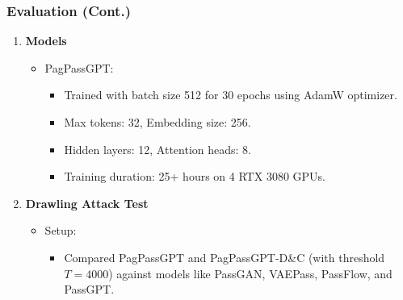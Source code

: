 \documentclass[
	12pt, %
]{beamer}
\begin{document}
\begin{frame}
	\frametitle{Evaluation (Cont.)}
	
	\begin{enumerate}
		\item \textbf{Models}
		\begin{itemize}
			\item PagPassGPT:
			\begin{itemize}
				\item Trained with batch size 512 for 30 epochs using AdamW optimizer.
				\item Max tokens: 32, Embedding size: 256.
				\item Hidden layers: 12, Attention heads: 8.
				\item Training duration: 25+ hours on 4 RTX 3080 GPUs.
			\end{itemize}
		\end{itemize}
		
		\item \textbf{Drawling Attack Test}
		\begin{itemize}
			\item Setup:
			\begin{itemize}
				\item Compared PagPassGPT and PagPassGPT-D\&C (with threshold $T=4000$) against models like PassGAN, VAEPass, PassFlow, and PassGPT.
			\end{itemize}
			
		\end{itemize}
	\end{enumerate}
\end{frame}
\end{document}
